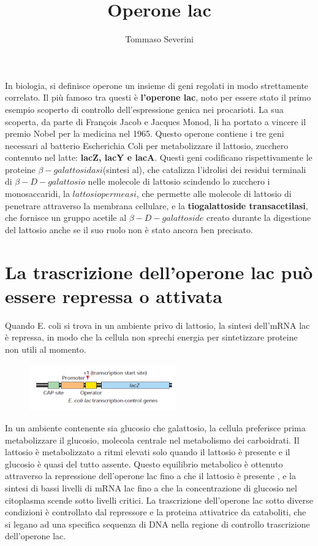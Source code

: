 \documentclass[10pt,a4paper]{article}
\author{Tommaso Severini}
\title{Operone lac}
\begin{document}
	\maketitle
	
	In biologia, si definisce operone un insieme di geni regolati in modo strettamente correlato. Il più famoso tra questi è \textbf{l'operone lac}, noto per essere stato il primo esempio scoperto di controllo dell'espressione genica nei procarioti. La sua scoperta, da parte di  François Jacob e Jacques Monod, li ha portato a vincere il premio Nobel per la medicina nel 1965. Questo operone contiene i tre geni necessari al batterio Escherichia Coli per metabolizzare il lattosio, zucchero contenuto nel latte: \textbf{lacZ, lacY e lacA}. Questi geni codificano rispettivamente le proteine \textbf{$\beta-galattosidasi$}(sintesi al), che catalizza l'idrolisi dei residui terminali di $\beta-D-galattosio$ nelle molecole di lattosio scindendo lo zucchero i monosaccaridi, la \textbf{$lattosio permeasi$}, che permette alle molecole di lattosio di penetrare attraverso la membrana cellulare, e la \textbf{tiogalattoside transacetilasi}, che fornisce un gruppo acetile al $\beta-D-galattoside$ creato durante la digestione del lattosio anche se il suo ruolo non è stato ancora ben precisato.
	
	\section{La trascrizione dell'operone lac può essere repressa o attivata}	
	
	Quando E. coli si trova in un ambiente privo di lattosio, la sintesi dell'mRNA lac è repressa, in modo che la cellula non sprechi energia per sintetizzare proteine non utili al momento.
	\begin{figure}
		\includegraphics[width=2.5in]{operone.png}
	\end{figure}
	In un ambiente contenente sia glucosio che galattosio, la cellula preferisce prima metabolizzare il glucosio, molecola centrale nel metabolismo dei carboidrati. Il lattosio è metabolizzato a ritmi elevati solo quando il lattosio è presente e il glucosio è quasi del tutto assente. Questo equilibrio metabolico è ottenuto attraverso la repressione dell'operone lac fino a che il lattosio è presente , e la sintesi di bassi livelli di mRNA lac fino a che la concentrazione di glucosio nel citoplasma scende sotto livelli critici. La trascrizione dell'operone lac sotto diverse condizioni è controllato dal repressore e la proteina attivatrice da cataboliti, che si legano ad una specifica sequenza di DNA nella regione di controllo trascrizione dell'operone lac.
	
\end{document}
